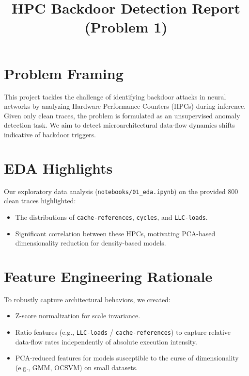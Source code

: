 \documentclass[11pt,a4paper]{article}
\title{HPC Backdoor Detection Report (Problem 1)}
\author{}
\date{}
\begin{document}
\maketitle



\section{Problem Framing}
This project tackles the challenge of identifying backdoor attacks in neural networks by analyzing Hardware Performance Counters (HPCs) during inference. Given only clean traces, the problem is formulated as an unsupervised anomaly detection task. We aim to detect microarchitectural data-flow dynamics shifts indicative of backdoor triggers.

\section{EDA Highlights}
Our exploratory data analysis (\texttt{notebooks/01\_eda.ipynb}) on the provided 800 clean traces highlighted:
\begin{itemize}
    \item The distributions of \texttt{cache-references}, \texttt{cycles}, and \texttt{LLC-loads}.
    \item Significant correlation between these HPCs, motivating PCA-based dimensionality reduction for density-based models.
\end{itemize}

\section{Feature Engineering Rationale}
To robustly capture architectural behaviors, we created:
\begin{itemize}
    \item Z-score normalization for scale invariance.
    \item Ratio features (e.g., \texttt{LLC-loads} / \texttt{cache-references}) to capture relative data-flow rates independently of absolute execution intensity.
    \item PCA-reduced features for models susceptible to the curse of dimensionality (e.g., GMM, OCSVM) on small datasets.
\end{itemize}
\end{document}
